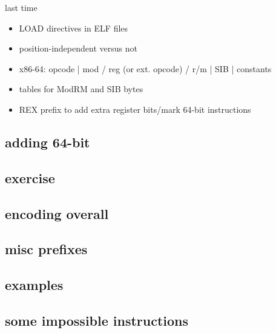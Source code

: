 \date{}
\title{}
\date{}

\begin{frame}
    \titlepage
\end{frame}



\begin{frame}{last time}
    \begin{itemize}
    \item LOAD directives in ELF files
    \item position-independent versus not
    \vspace{.5cm}
    \item x86-64: opcode | mod / reg (or ext. opcode) / r/m | SIB | constants
    \item tables for ModRM and SIB bytes
    \item REX prefix to add extra register bits/mark 64-bit instructions
    \end{itemize}
\end{frame}

\subsection{adding 64-bit}


\subsection{exercise}


\subsection{encoding overall}


\subsection{misc prefixes}


\subsection{examples}


\subsection{some impossible instructions}


